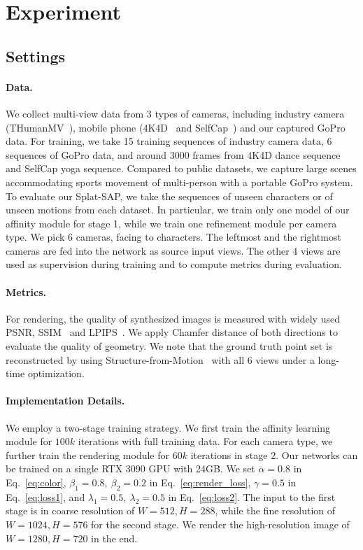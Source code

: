 
\section{Experiment}
\label{sec:exp}

\subsection{Settings}

\paragraph{Data.} We collect multi-view data from 3 types of cameras, including industry camera (THumanMV~\cite{zhou2024gps}), mobile phone (4K4D~\cite{xu20244k4d} and SelfCap~\cite{xu2024representing}) and our captured GoPro data. 
%
For training, we take 15 training sequences of industry camera data, 6 sequences of GoPro data, and around 3000 frames from 4K4D dance sequence and SelfCap yoga sequence. 
Compared to public datasets, we capture large scenes accommodating sports movement of multi-person with a portable GoPro system.  
%
To evaluate our Splat-SAP, we take the sequences of unseen characters or of unseen motions from each dataset.
%
In particular, we train only one model of our affinity module for stage 1, while we train one refinement module per camera type.
%
We pick 6 cameras, facing to characters. %
%
The leftmost and the rightmost cameras are fed into the network as source input views.
%
The other 4 views are used as supervision during training and to compute metrics during evaluation.

\paragraph{Metrics.} For rendering, the quality of synthesized images is measured with widely used PSNR, SSIM~\cite{wang2004ssim} and LPIPS~\cite{zhang2018lpips}.
%
We apply Chamfer distance of both directions to evaluate the quality of geometry.
%
We note that the ground truth point set is reconstructed by using Structure-from-Motion~\cite{schoenberger2016sfm} with all 6 views under a long-time optimization.

\paragraph{Implementation Details.} We employ a two-stage training strategy.
%
We first train the affinity learning module for $100k$ iterations with full training data.
%
For each camera type, we further train the rendering module for $60k$ iterations in stage 2.
%
Our networks can be trained on a single RTX 3090 GPU with 24GB.
%
We set $\alpha = 0.8$ in Eq.~\ref{eq:color}, $\beta_1 = 0.8,\ \beta_2 = 0.2$ in Eq.~\ref{eq:render_loss}, $\gamma = 0.5$ in Eq.~\ref{eq:loss1}, and $\lambda_1 = 0.5,\ \lambda_2 = 0.5$ in Eq.~\ref{eq:loss2}.
%
The input to the first stage is in coarse resolution of $W = 512, H=288$, while the fine resolution of $W=1024, H=576$ for the second stage. 
%
We render the high-resolution image of $W=1280, H=720$ in the end.  



